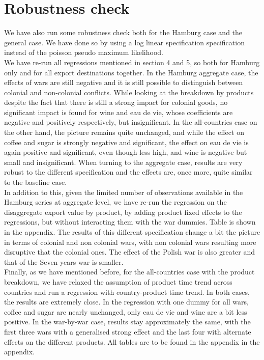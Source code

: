 \documentclass[12pt,a4paper,titlepage,english]{article}
\begin{document}
\section{Robustness check}
We have also run some robustness check both for the Hamburg case and the general case. We have done so by using a log linear specification specification instead of the poisson pseudo maximum likelihood. \\
We have re-run all regressions mentioned in section 4 and 5, so both for Hamburg only and for all export destinations together. In the Hamburg aggregate case, the effects of wars are still negative and it is still possible to distinguish between colonial and non-colonial conflicts. While looking at the breakdown by products despite the fact that there is still a strong impact for colonial goods, no significant impact is found for wine and eau de vie, whose coefficients are negative and positively respectively, but insignificant. In the all-countries case on the other hand, the picture remains quite unchanged, and while the effect on coffee and sugar is strongly negative and significant, the effect on eau de vie is again positive and significant, even though less high, and wine is negative but small and insignificant. When turning to the aggregate case, results are very robust to the different specification and the effects are, once more, quite similar to the baseline case. \\
In addition to this, given the limited number of observations available in the Hamburg series at aggregate level, we have re-run the regression on the disaggregate export value by product, by adding product fixed effects to the regressions, but without interacting them with the war dummies. Table is shown in the appendix. The results of this different specification change a bit the picture in terms of colonial and non colonial wars, with non colonial wars resulting more disruptive that the colonial ones. The effect of the Polish war is also greater and that of the Seven years war is smaller.\\
Finally, as we have mentioned before, for the all-countries case with the product breakdown, we have relaxed the assumption of product time trend across countries and run a regression with country-product time trend. In both cases, the results are extremely close. In the regression with one dummy for all wars, coffee and sugar are nearly unchanged, only eau de vie and wine are a bit less positive. In the war-by-war case, results stay approximately the same, with the first three wars with a generalised strong effect and the last four with alternate effects on the different products. All tables are to be found in the appendix in the appendix.
\end{document}
